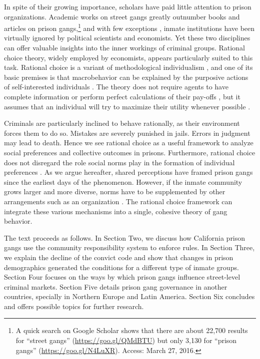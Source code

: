 \documentclass[a4paper, 12pt]{article}
\begin{document}
In spite of their growing importance, scholars have paid little attention to prison organizations. Academic works on street gangs greatly outnumber books and articles on prison gangs,\footnote{A quick search on Google Scholar shows that there are about 22,700 results for ``street gangs'' (\href{https://goo.gl/QMdBTU}{https://goo.gl/QMdBTU}) but only 3,130 for ``prison gangs'' (\href{https://goo.gl/N4LuXR}{https://goo.gl/N4LuXR}). Access: March 27, 2016.} and with few exceptions \citep[e.g.][]{freire2014entering,lessing2014build,skarbek2010self,skarbek2011governance,skarbek2012prison,skarbek2014social}, inmate institutions have been virtually ignored by political scientists and economists. Yet these two disciplines can offer valuable insights into the inner workings of criminal groups. Rational choice theory, widely employed by economists, appears particularly suited to this task. Rational choice is a variant of methodological individualism \citep{arrow1994methodological,blaug1992methodology}, and one of its basic premises is that macrobehavior can be explained by the purposive actions of self-interested individuals \citep{friedman1988contribution,udehn2002methodological}. The theory does not require agents to have complete information or perform perfect calculations of their pay-offs \citep{simon1955behavioral}, but it assumes that an individual will try to maximize their utility whenever possible \citep{neumann1947theory,friedman1948utility}.

Criminals are particularly inclined to behave rationally, as their environment forces them to do so. Mistakes are severely punished in  jails. Errors in judgment may lead to death. Hence we see rational choice as a useful framework to analyze social preferences and collective outcomes in prisons. Furthermore, rational choice does not disregard the role social norms play in the formation of individual preferences \citep{crawford1995grammar,elster1989social,ostrom2014collective}. As we argue hereafter, shared perceptions have framed prison gangs since the earliest days of the phenomenon. However, if the inmate community grows larger and more diverse, norms have to be supplemented by other arrangements such as an organization \citep{skarbek2012prison}. The rational choice framework can integrate these various mechanisms into a single, cohesive theory of gang behavior. 

The text proceeds as follows. In Section Two, we discuss how California prison gangs use the community responsibility system to enforce rules. In Section Three, we explain the decline of the convict code and show that changes in prison demographics generated the conditions for a different type of inmate groups. Section Four focuses on the ways by which prison gangs influence street-level criminal markets. Section Five details prison gang governance in another countries, specially in Northern Europe and Latin America. Section Six concludes and offers possible topics for further research. 
\end{document}
